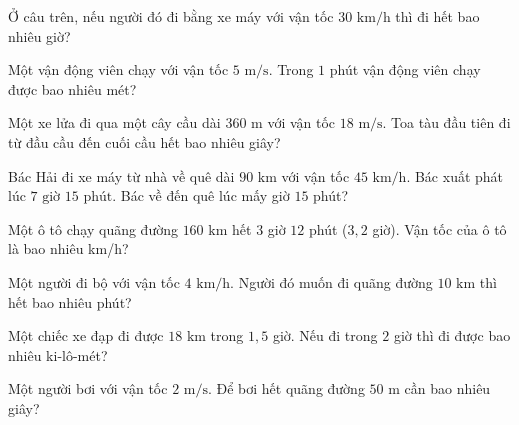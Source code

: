 \begin{ex}
  Ở câu trên, nếu người đó đi bằng xe máy với vận tốc $30\text{ km/h}$ thì đi hết bao nhiêu giờ?
\end{ex}

\begin{ex}
  Một vận động viên chạy với vận tốc $5\text{ m/s}$. Trong $1$ phút vận động viên chạy được bao nhiêu mét?
\end{ex}

\begin{ex}
  Một xe lửa đi qua một cây cầu dài $360\text{ m}$ với vận tốc $18\text{ m/s}$. Toa tàu đầu tiên đi từ đầu cầu đến cuối cầu hết bao nhiêu giây?
\end{ex}

\begin{ex}
  Bác Hải đi xe máy từ nhà về quê dài $90\text{ km}$ với vận tốc $45\text{ km/h}$. Bác xuất phát lúc $7\text{ giờ } 15\text{ phút}$. Bác về đến quê lúc mấy giờ $15$ phút?
\end{ex}

\begin{ex}
  Một ô tô chạy quãng đường $160\text{ km}$ hết $3$ giờ $12$ phút ($3{,}2$ giờ). Vận tốc của ô tô là bao nhiêu km/h?
\end{ex}

\begin{ex}
  Một người đi bộ với vận tốc $4\text{ km/h}$. Người đó muốn đi quãng đường $10\text{ km}$ thì hết bao nhiêu phút?
\end{ex}

\begin{ex}
  Một chiếc xe đạp đi được $18\text{ km}$ trong $1{,}5$ giờ. Nếu đi trong $2$ giờ thì đi được bao nhiêu ki-lô-mét?
\end{ex}

\begin{ex}
  Một người bơi với vận tốc $2\text{ m/s}$. Để bơi hết quãng đường $50\text{ m}$ cần bao nhiêu giây?
\end{ex}

